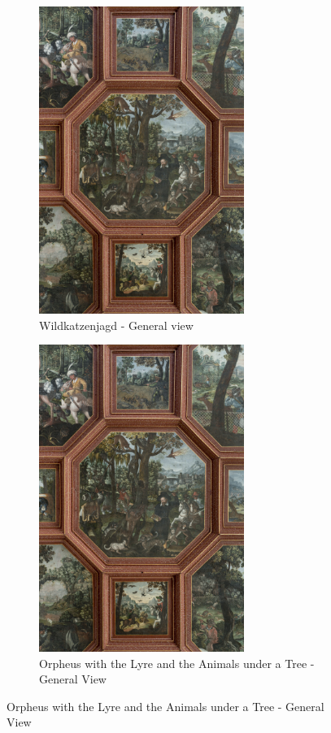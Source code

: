 \documentclass[
  a4paper,
]{book}
\begin{document}
\begin{figure}
\begin{figure}[H]    
  \includegraphics[height=10cm]{images/fmd10024325a.jpg}
  \caption{Wildkatzenjagd - General view}
  \label{fig:{images/fmd10024325a.jpg}}
\end{figure}

\clearpage

\begin{figure}[H]    
  \includegraphics[height=10cm]{images/fmd10024325a.jpg}
  \caption{Orpheus with the Lyre and the Animals under a Tree - General View}
  \label{fig:{images/fmd10024325a.jpg}}
\end{figure}

\clearpage


\end{figure}
\end{document}
